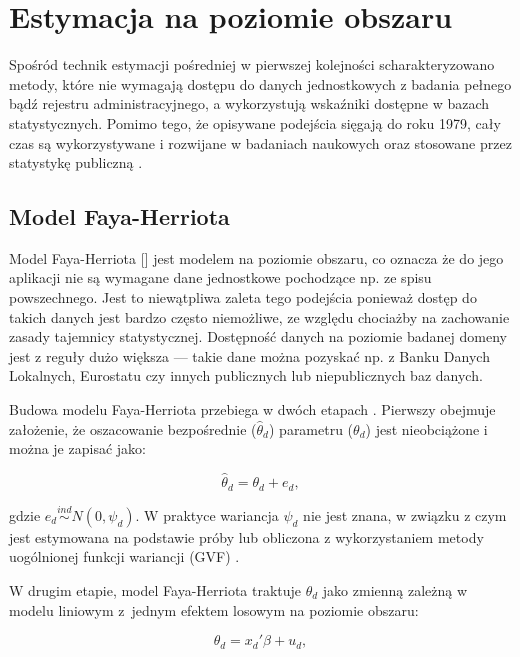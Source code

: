 \section{Estymacja na poziomie obszaru}

Spośród technik estymacji pośredniej w pierwszej kolejności scharakteryzowano metody, które nie wymagają dostępu do danych jednostkowych z badania pełnego bądź rejestru administracyjnego, a wykorzystują wskaźniki dostępne w bazach statystycznych. Pomimo tego, że opisywane podejścia sięgają do roku 1979, cały czas są wykorzystywane i rozwijane w badaniach naukowych oraz stosowane przez statystykę publiczną \citep{saipe}.

\subsection{Model Faya-Herriota}

Model Faya-Herriota [\citeyear{fh1979}] jest modelem na poziomie obszaru, co oznacza że do jego aplikacji nie są wymagane dane jednostkowe pochodzące np. ze spisu powszechnego. Jest to niewątpliwa zaleta tego podejścia ponieważ dostęp do takich danych jest bardzo często niemożliwe, ze względu chociażby na zachowanie zasady tajemnicy statystycznej. Dostępność danych na poziomie badanej domeny jest z reguły dużo większa --- takie dane można pozyskać np. z Banku Danych Lokalnych, Eurostatu czy innych publicznych lub niepublicznych baz danych.

Budowa modelu Faya-Herriota przebiega w dwóch etapach \citep{torabi2008}. Pierwszy obejmuje założenie, że oszacowanie bezpośrednie ($\hat{\theta}_d$) parametru ($\theta_d$) jest nieobciążone i można je zapisać jako:

\begin{equation}
\hat{\theta}_d = \theta_d + e_d,
\end{equation}

gdzie $e_d\stackrel{ind}{\sim} N(0,\psi_{d})$. W praktyce wariancja $\psi_d$ nie jest znana, w związku z czym jest estymowana na podstawie próby lub obliczona z wykorzystaniem metody uogólnionej funkcji wariancji (GVF) \citep{wolter2007}.

W drugim etapie, model Faya-Herriota traktuje $\theta_d$ jako zmienną zależną w modelu liniowym z~jednym efektem losowym na poziomie obszaru:

\begin{equation}
\theta_d=x_d'\beta+u_d,
\end{equation}

